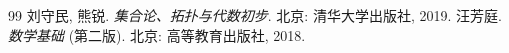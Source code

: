 \documentclass[../book.tex]{subfiles}
\begin{document}
\renewcommand{\bibname}{参考文献}

\begin{thebibliography}{99}
    \setlength{\itemsep}{0pt}    
    \setlength{\parsep}{0pt}
     刘守民, 熊锐. \textit{集合论、拓扑与代数初步}. 北京: 清华大学出版社, 2019.
     汪芳庭. \textit{数学基础} (第二版). 北京: 高等教育出版社, 2018.
\end{thebibliography}
\end{document}
